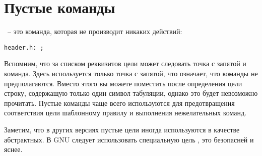 \section{Пустые команды}
\label{sec:empty_commands}

~-- это команда, которая не производит никаких
действий:

{\footnotesize
\begin{verbatim}
header.h: ;
\end{verbatim}
}

Вспомним, что за списком реквизитов цели может следовать точка с
запятой и команда. Здесь используется только точка с запятой, что
означает, что команды не предполагаются. Вместо этого вы можете
поместить после определения цели строку, содержащую только один символ
табуляции, однако это будет невозможно прочитать. Пустые команды чаще
всего используются для предотвращения соответствия цели шаблонному
правилу и выполнения нежелательных команд.

Заметим, что в других версиях \GNUmake{} пустые цели иногда
используются в качестве абстрактных. В GNU \GNUmake{} следует
использовать специальную цель , это безопасней и яснее.
